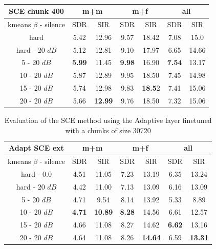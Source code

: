 \documentclass[master, tikz, final,11pt, dvipdfmx]{iscs-thesis}
\begin{document}
\begin{table}[h]
\centering
\begin{tabular}{c|c|c|c|c|c|c}
SCE chunk 400 & \multicolumn{2}{c|}{m+m} & \multicolumn{2}{c|}{m+f} & \multicolumn{2}{c}{all} \\ 
\hline 
kmeans $\beta$ - silence & SDR & SIR & SDR & SIR & SDR & SIR \\ 
\hline
hard  & 5.42 & 12.96 & 9.57 & 18.42 & 7.08 & 15.0 \\ 
\hline
hard - 20 $dB$  & 5.12 & 12.81 & 9.10 & 17.97 & 6.65 & 14.66 \\
\hline
5 - 20 $dB$  & \cellcolor{green}\textbf{5.99} & \cellcolor{green}11.45 & \cellcolor{green}\textbf{9.98} & \cellcolor{green}16.90 & \cellcolor{green}\textbf{7.54} & \cellcolor{green}13.17 \\ 
\hline
10 - 20 $dB$  & 5.87 & 12.89 & 9.95 & 18.50 & 7.45 & 14.98 \\ 
\hline
15 - 20 $dB$ & 5.74 & 12.98 & 9.83 & \textbf{18.5}2 & 7.41 & 15.06 \\ 
\hline
20 - 20 $dB$ & 5.66 & \textbf{12.99} & 9.76 & 18.50 & 7.32 & 15.06 \\ 
\end{tabular}
\captionsetup{justification=centering}
\caption{}
\label{table:SCE400}
\end{table}

\begin{table}[h]
\centering
\begin{tabular}{c|c|c|c|c|c|c}
Adapt SCE ext & \multicolumn{2}{c|}{m+m} & \multicolumn{2}{c|}{m+f} & \multicolumn{2}{c}{all} \\ 
\hline 
kmeans $\beta$ - silence & SDR & SIR & SDR & SIR & SDR & SIR \\ 
\hline
hard - 0.0  & 4.51 & 11.05 & 7.23 & 13.19 & 6.35 & 13.24 \\ 
\hline
hard - 20 $dB$  & 4.42 & 11.00 & 7.13 & 13.09 & 6.16 & 13.09 \\
\hline
5 - 20 $dB$  & 4.71 & 9.54 & 8.14 & 13.92 & 5.33 & 8.89 \\ 
\hline
10 - 20 $dB$  & \cellcolor{green}\textbf{4.71} & \cellcolor{green}\textbf{10.89} & \cellcolor{green}\textbf{8.28} & \cellcolor{green}14.56 & 6.61 & 12.57 \\ 
\hline
15 - 20 $dB$ & 4.66 & 11.08 & 8.27 & 14.62 & \cellcolor{green}\textbf{6.62} & \cellcolor{green}13.16 \\ 
\hline
20 - 20 $dB$ & 4.64 & 11.08 & 8.26 & \textbf{14.64} & 6.59 & \textbf{13.31} \\ 
\end{tabular}
\caption{Evaluation of the SCE method using the Adaptive layer finetuned with a chunks of size 30720}
\label{table:AdaptSCEext}
\end{table}
\end{document}
